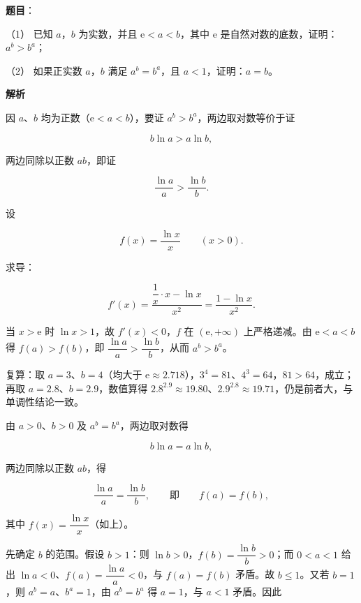 \begin{answer}

\textbf{题目}：

（1） 已知 $a$，$b$ 为实数，并且 $\mathrm e<a<b$，其中 $\mathrm e$ 是自然对数的底数，证明：$a^b>b^a$；

（2） 如果正实数 $a$，$b$ 满足 $a^b=b^a$，且 $a<1$，证明：$a=b$。

\textbf{解析}


因 $a$、$b$ 均为正数（$\mathrm e<a<b$），要证 $a^b>b^a$，两边取对数等价于证

\nopagebreak[4]
\[
b\ln a>a\ln b,
\]

两边同除以正数 $ab$，即证

\nopagebreak[4]
\[
\frac{\ln a}{a}>\frac{\ln b}{b}.
\]

设

\nopagebreak[4]
\[
f(x)=\frac{\ln x}{x}\qquad(x>0).
\]

求导：

\nopagebreak[4]
\[
f'(x)=\frac{\dfrac1x\cdot x-\ln x}{x^2}=\frac{1-\ln x}{x^2}.
\]

当 $x>\mathrm e$ 时 $\ln x>1$，故 $f'(x)<0$，$f$ 在 $(\mathrm e,+\infty)$ 上严格递减。由 $\mathrm e<a<b$ 得 $f(a)>f(b)$，即 $\dfrac{\ln a}{a}>\dfrac{\ln b}{b}$，从而 $a^b>b^a$。

复算：取 $a=3$、$b=4$（均大于 $\mathrm e\approx2.718$），$3^4=81$、$4^3=64$，$81>64$，成立；再取 $a=2.8$、$b=2.9$，数值算得 $2.8^{2.9}\approx19.80$、$2.9^{2.8}\approx19.71$，仍是前者大，与单调性结论一致。


由 $a>0$、$b>0$ 及 $a^b=b^a$，两边取对数得

\nopagebreak[4]
\[
b\ln a=a\ln b,
\]

两边同除以正数 $ab$，得

\nopagebreak[4]
\[
\frac{\ln a}{a}=\frac{\ln b}{b},\qquad\text{即}\qquad f(a)=f(b),
\]

其中 $f(x)=\dfrac{\ln x}{x}$（如上）。

先确定 $b$ 的范围。假设 $b>1$：则 $\ln b>0$，$f(b)=\dfrac{\ln b}{b}>0$；而 $0<a<1$ 给出 $\ln a<0$、$f(a)=\dfrac{\ln a}{a}<0$，与 $f(a)=f(b)$ 矛盾。故 $b\leqslant1$。又若 $b=1$，则 $a^b=a$、$b^a=1$，由 $a^b=b^a$ 得 $a=1$，与 $a<1$ 矛盾。因此


\end{answer}
